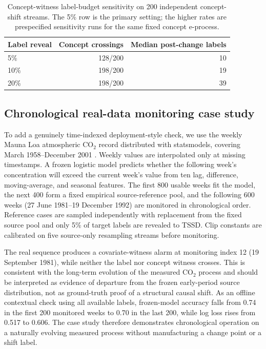 \documentclass[11pt,a4paper]{article}
\theoremstyle{definition}
\newcommand{\1}{\mathbf{1}}
\begin{document}
\begin{table}[t]
\centering
\caption{Concept-witness label-budget sensitivity on 200 independent concept-shift streams. The 5\% row is the primary setting; the higher rates are prespecified sensitivity runs for the same fixed concept e-process.}
\label{tab:concept_sens}
\small
\begin{tabular}{lrr}
\toprule
Label reveal & Concept crossings & Median post-change labels \\
\midrule
5\% & 128/200 & 10 \\
10\% & 198/200 & 19 \\
20\% & 198/200 & 39 \\
\bottomrule
\end{tabular}
\end{table}

\subsection{Chronological real-data monitoring case study}
To add a genuinely time-indexed deployment-style check, we use the weekly Mauna Loa atmospheric CO$_2$ record distributed with statsmodels, covering March 1958--December 2001 \citep{keeling2004}. Weekly values are interpolated only at missing timestamps. A frozen logistic model predicts whether the following week's concentration will exceed the current week's value from ten lag, difference, moving-average, and seasonal features. The first 800 usable weeks fit the model, the next 400 form a fixed empirical source-reference pool, and the following 600 weeks (27 June 1981--19 December 1992) are monitored in chronological order. Reference cases are sampled independently with replacement from the fixed source pool and only 5\% of target labels are revealed to TSSD. Clip constants are calibrated on five source-only resampling streams before monitoring.

The real sequence produces a covariate-witness alarm at monitoring index 12 (19 September 1981), while neither the label nor concept witness crosses. This is consistent with the long-term evolution of the measured CO$_2$ process and should be interpreted as evidence of departure from the frozen early-period source distribution, not as ground-truth proof of a structural causal shift. As an offline contextual check using all available labels, frozen-model accuracy falls from 0.74 in the first 200 monitored weeks to 0.70 in the last 200, while log loss rises from 0.517 to 0.606. The case study therefore demonstrates chronological operation on a naturally evolving measured process without manufacturing a change point or a shift label.
\end{document}
